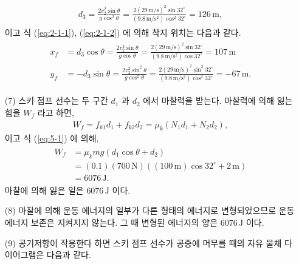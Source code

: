 \documentclass[floatfix,nofootinbib,superscriptaddress,fleqn]{revtex4-2}
\begin{document}
\begin{itemize}
\begin{align}
    \begin{split}
      d_3 = \frac{2v^2_2\sin{\theta}}{g\cos^2{\theta}}
      =\frac{2(29\,\mathrm{m/s})^2\sin{32^\circ}}
      {(9.8\,\mathrm{m/s^2})\cos^2{32^\circ}}
      =126\,\mathrm{m},
    \end{split}
  \end{align} 
  이고 식 (\ref{eq:2-1-1}), (\ref{eq:2-1-2}) 에 의해 착지 위치는 다음과 같다.
  \begin{align}
    \begin{split}
      x_f &= d_3\cos{\theta}
      =\frac{2v^2_2\sin{\theta}}{g\cos{\theta}}
      =\frac{2(29\,\mathrm{m/s})^2\sin{32^\circ}}
      {(9.8\,\mathrm{m/s^2})\cos{32^\circ}}
      =107\,\mathrm{m} \\
      y_f &= -d_3\sin{\theta}
      =\frac{2v^2_2\sin^2{\theta}}{g\cos^2{\theta}}
      =\frac{2(29\,\mathrm{m/s})^2\sin^2{32^\circ}}
      {(9.8\,\mathrm{m/s^2})\cos^2{32^\circ}}
      =-67\,\mathrm{m}.
    \end{split}
  \end{align}
  \item[(7)] 스키 점프 선수는 두 구간 $d_1$ 과 $d_2$ 에서 마찰력을 받는다. 
  마찰력에 의해 잃는 힘을 $W_f$ 라고 하면,
  \begin{align}
    W_f = f_{k1}d_1+f_{k2}d_2  = \mu_k(N_1d_1+N_2d_2),
  \end{align}
  이고 식 (\ref{eq:5-1}) 에 의해,
  \begin{align}
    \begin{split}
      W_f &= \mu_kmg(d_1\cos{\theta}+d_2)  \\
      &= (0.1)(700\,\mathrm{N})\left((100\,\mathrm{m})\cos{32^\circ}
      +2\,\mathrm{m}\right) \\
      &= 6076\,\mathrm{J}.
    \end{split}
  \end{align}
  마찰에 의해 잃은 일은 $6076\,\mathrm{J}$ 이다.
  \item[(8)] 마찰에 의해 운동 에너지의 일부가 다른 형태의 에너지로 변형되었으므로 운동 에너지 보존은
   지켜지지 않는다. 그 때 변형된 에너지의 양은 $6076\,\mathrm{J}$ 이다.
  \item[(9)] 공기저항이 작용한다 하면 스키 점프 선수가 공중에 머무를 때의
   자유 물체 다이어그램은 다음과 같다.
  \begin{figure}[h]
\end{figure}
\end{itemize}
\end{document}
